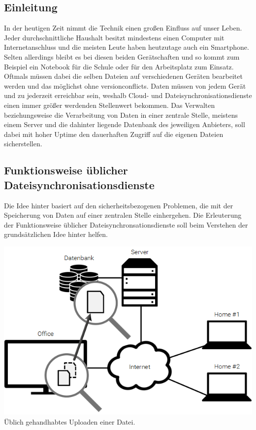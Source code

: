 \subsection{Einleitung}
In der heutigen Zeit nimmt die Technik einen großen Einfluss auf unser Leben.
Jeder durchschnittliche Haushalt besitzt mindestens einen Computer mit
Internetanschluss und die meisten Leute haben heutzutage auch ein Smartphone.
Selten allerdings bleibt es bei diesen beiden Gerätschaften und so kommt zum Beispiel
ein Notebook für die Schule oder für den Arbeitsplatz zum Einsatz. Oftmals
müssen dabei die selben Dateien auf verschiedenen Geräten bearbeitet werden und
das möglichst ohne \glspl{versionconflict}. Daten müssen von jedem
Gerät und zu jederzeit erreichbar sein, weshalb Cloud- und
Dateisynchronisationsdienste einen immer größer werdenden Stellenwert bekommen.
Das Verwalten beziehungsweise die Verarbeitung von Daten in einer
zentrale Stelle, meistens einem Server und die dahinter liegende Datenbank des
jeweiligen Anbieters, soll dabei mit hoher Uptime den dauerhaften Zugriff auf
die eigenen Dateien sicherstellen.

\subsection{Funktionsweise üblicher Dateisynchronisationsdienste}
Die Idee hinter \sblit basiert auf den sicherheitsbezogenen Problemen, die mit
der Speicherung von Daten auf einer zentralen Stelle einhergehen. Die
Erleuterung der Funktionsweise üblicher Dateisynchronsationsdienste soll beim
Verstehen der grundsätzlichen Idee hinter \sblit helfen.

\includegraphics[]{images/Dropbox_1}
Üblich gehandhabtes Uploaden einer Datei.

